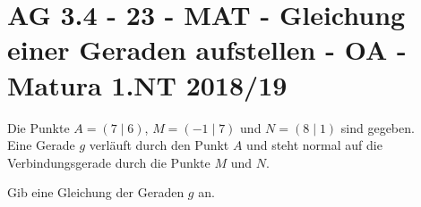 \section{AG 3.4 - 23 - MAT - Gleichung einer Geraden aufstellen - OA - Matura 1.NT 2018/19}

\begin{beispiel}[AG 3.4]{1}
Die Punkte $A=(7\mid 6)$, $M=(-1\mid 7)$ und $N=(8\mid 1)$ sind gegeben.\\
Eine Gerade $g$ verläuft durch den Punkt $A$ und steht normal auf die Verbindungsgerade durch die Punkte $M$ und $N$.

Gib eine Gleichung der Geraden $g$ an.

\end{beispiel}
